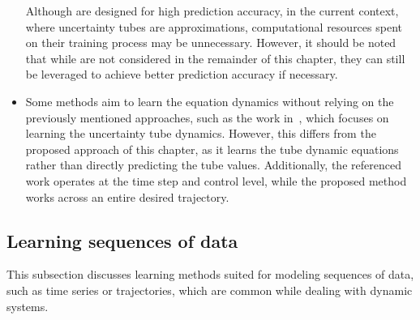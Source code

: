 \begin{itemize}
    Although  are designed for high prediction accuracy, in the current context, where uncertainty tubes are approximations, computational resources spent on their training process may be unnecessary.
    However, it should be noted that while  are not considered in the remainder of this chapter, they can still be leveraged to achieve better prediction accuracy if necessary.
    \item Some methods aim to learn the equation dynamics without relying on the previously mentioned approaches, such as the work in~\cite{cTubeMPCLearning}, which focuses on learning the uncertainty tube dynamics.
    However, this differs from the proposed approach of this chapter, as it learns the tube dynamic equations rather than directly predicting the tube values. 
    Additionally, the referenced work operates at the time step and control level, while the proposed method works across an entire desired trajectory.
\end{itemize}

\subsection{Learning sequences of data}

This subsection discusses learning methods suited for modeling sequences of data, such as time series or trajectories, which are common while dealing with dynamic systems.

